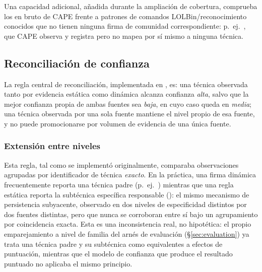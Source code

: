 Una capacidad adicional, a\~nadida durante la ampliaci\'on de
cobertura, comprueba los  en bruto de CAPE
frente a patrones de comandos LOLBin/reconocimiento conocidos que no
tienen ninguna firma de comunidad correspondiente: p.\ ej.\
, que CAPE observa y registra pero no
mapea por s\'i mismo a ninguna t\'ecnica.

\subsection{Reconciliaci\'on de confianza}
\label{sec:reconciliation}

La regla central de reconciliaci\'on, implementada en
, es: una t\'ecnica observada tanto
por evidencia est\'atica como din\'amica alcanza confianza
\emph{alta}, salvo que la mejor confianza propia de ambas fuentes sea
\emph{baja}, en cuyo caso queda en \emph{media}; una t\'ecnica
observada por una sola fuente mantiene el nivel propio de esa fuente,
y no puede promocionarse por volumen de evidencia de una \'unica
fuente.

\subsubsection{Extensi\'on entre niveles}

Esta regla, tal como se implement\'o originalmente, comparaba
observaciones agrupadas por identificador de t\'ecnica \emph{exacto}.
En la pr\'actica, una firma din\'amica frecuentemente reporta una
t\'ecnica padre (p.\ ej.\ \technique{T1547}) mientras que una regla
est\'atica reporta la subt\'ecnica espec\'ifica responsable
(): el mismo mecanismo de persistencia
subyacente, observado en dos niveles de especificidad distintos por
dos fuentes distintas, pero que nunca se corroboran entre s\'i bajo un
agrupamiento por coincidencia exacta. Esta es una inconsistencia real,
no hipot\'etica: el propio emparejamiento a nivel de familia del
arn\'es de evaluaci\'on (\S\ref{sec:evaluation}) ya trata una t\'ecnica
padre y su subt\'ecnica como equivalentes a efectos de puntuaci\'on,
mientras que el modelo de confianza que produce el resultado puntuado
no aplicaba el mismo principio.

